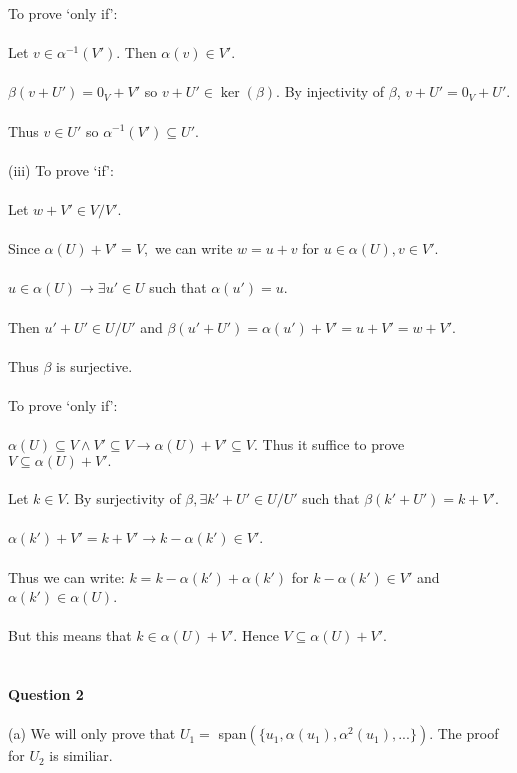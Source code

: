 \documentclass{article}
\begin{document}
To prove `only if':\\\\
Let $v\in\alpha^{-1}(V')$. Then $\alpha(v) \in V'$.\\\\
$\beta(v+U') = 0_V + V'$ so $v+U'\in \ker(\beta)$. By injectivity of $\beta$,
$v + U' = 0_V + U'$.\\\\Thus $v\in U'$ so $\alpha^{-1}(V') \subseteq U'$.\\\\
(iii) To prove `if':\\\\
Let $w+V' \in V/V'$.\\\\Since $\alpha(U) + V' = V,$ we can write $w = u + v$ for $u\in \alpha(U), v \in V'$.\\\\
$u\in\alpha(U) \to \exists u' \in U$ such that $ \alpha(u') = u$.\\\\Then $u' + U' \in U/U'$ and $\beta(u'+U') = \alpha(u') + V' = u + V' = w + V'$. \\\\ Thus $\beta$ is surjective. \\\\
To prove `only if':\\\\
$\alpha(U)\subseteq V \land V' \subseteq V \to \alpha(U) + V' \subseteq V$. Thus it suffice to prove $V\subseteq\alpha(U) + V'.$\\\\
Let $k\in V.$ By surjectivity of $\beta, \exists k'+U' \in U/U'$ such that $\beta(k'+U') = k + V'$.\\\\
$\alpha(k') + V' = k + V' \to k-\alpha(k') \in V'$.\\\\
Thus we can write: $k = k - \alpha(k') + \alpha(k')$ for $k-\alpha(k')\in V'$ and $\alpha(k')\in \alpha(U)$.\\\\
But this means that $k\in \alpha(U) + V'.$ Hence $V\subseteq \alpha(U) + V'$.\\\\\\
\textbf{Question 2}\\\\
(a) We will only prove that $U_1 = $ span$(\{u_1,\alpha(u_1),\alpha^2(u_1),...\}).$ The proof for $U_2$ is similiar.\\\\
\end{document}
